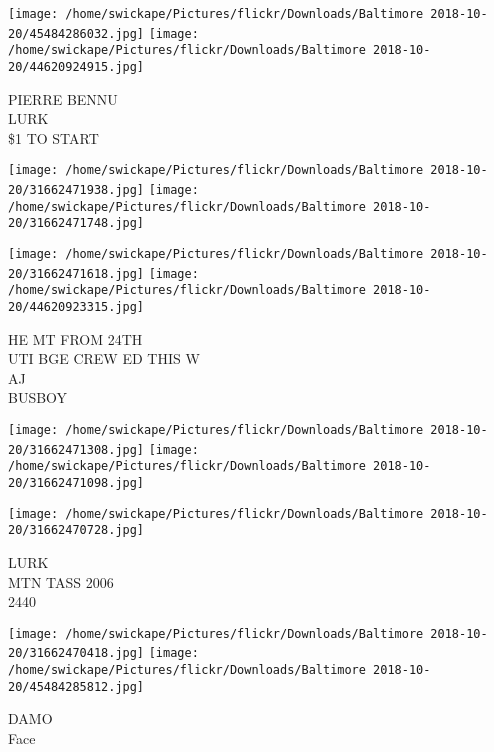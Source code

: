 \documentclass[10pt,letterpaper]{article}
\begin{document}
\vspace{0.25in}
\texttt{[image: /home/swickape/Pictures/flickr/Downloads/Baltimore 2018-10-20/45484286032.jpg]}
\texttt{[image: /home/swickape/Pictures/flickr/Downloads/Baltimore 2018-10-20/44620924915.jpg]}

PIERRE BENNU\\
LURK\\
\$1 TO START
\pagebreak

\texttt{[image: /home/swickape/Pictures/flickr/Downloads/Baltimore 2018-10-20/31662471938.jpg]}
\texttt{[image: /home/swickape/Pictures/flickr/Downloads/Baltimore 2018-10-20/31662471748.jpg]}

\texttt{[image: /home/swickape/Pictures/flickr/Downloads/Baltimore 2018-10-20/31662471618.jpg]}
\texttt{[image: /home/swickape/Pictures/flickr/Downloads/Baltimore 2018-10-20/44620923315.jpg]}

HE MT FROM 24TH\\
UTI BGE CREW ED THIS W\\
AJ\\
BUSBOY
\pagebreak

\texttt{[image: /home/swickape/Pictures/flickr/Downloads/Baltimore 2018-10-20/31662471308.jpg]}
\texttt{[image: /home/swickape/Pictures/flickr/Downloads/Baltimore 2018-10-20/31662471098.jpg]}

\vspace{0.25in}
\texttt{[image: /home/swickape/Pictures/flickr/Downloads/Baltimore 2018-10-20/31662470728.jpg]}

LURK\\
MTN TASS 2006\\
2440
\pagebreak

\texttt{[image: /home/swickape/Pictures/flickr/Downloads/Baltimore 2018-10-20/31662470418.jpg]}
\texttt{[image: /home/swickape/Pictures/flickr/Downloads/Baltimore 2018-10-20/45484285812.jpg]}

DAMO\\
Face
\pagebreak
\end{document}
